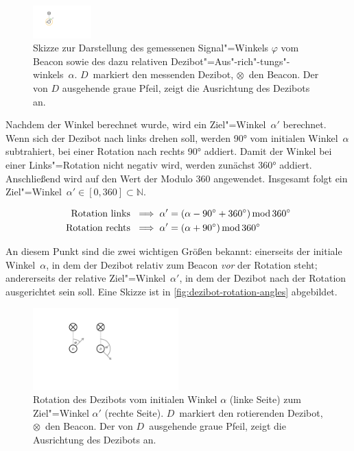 \begin{figure}[h]
    \centering
    \includegraphics[width=0.2\textwidth]{../assets/signal_dezibot_angle.pdf}
    \caption{Skizze zur Darstellung des gemessenen Signal"=Winkels $\varphi$ vom Beacon sowie des dazu relativen Dezibot"=Aus"-rich"-tungs"-winkels~$\alpha$. $D$~markiert den messenden Dezibot, $\otimes$~den Beacon. Der von $D$ ausgehende graue Pfeil, zeigt die Ausrichtung des Dezibots an.}
    \label{fig:signal-dezibot-angle}
\end{figure}

Nachdem der Winkel berechnet wurde, wird ein Ziel"=Winkel~$\alpha'$ berechnet. Wenn sich der Dezibot nach links drehen soll, werden 90° vom initialen Winkel~$\alpha$ subtrahiert, bei einer Rotation nach rechts 90° addiert. Damit der Winkel bei einer Links"=Rotation nicht negativ wird, werden zunächst 360° addiert. Anschließend wird auf den Wert der Modulo 360 angewendet. Insgesamt folgt ein Ziel"=Winkel~$\alpha' \in [0,360] \subset \mathbb{N}$.

\begin{equation*}
\begin{aligned}
    \text{Rotation links } &\implies \alpha' = (\alpha - 90^\circ + 360^\circ) \operatorname{mod} 360^\circ \\
    \text{Rotation rechts } &\implies \alpha' = (\alpha + 90^\circ) \operatorname{mod} 360^\circ
\end{aligned}
\end{equation*}

An diesem Punkt sind die zwei wichtigen Größen bekannt: einerseits der initiale Winkel~$\alpha$, in dem der Dezibot relativ zum Beacon \emph{vor} der Rotation steht; andererseits der relative Ziel"=Winkel~$\alpha'$, in dem der Dezibot nach der Rotation ausgerichtet sein soll. Eine Skizze ist in \autoref{fig:dezibot-rotation-angles} abgebildet.

\begin{figure}[h]
    \centering
    \includegraphics[width=0.5\textwidth]{../assets/dezibot_rotation_angles.pdf}
    \caption{Rotation des Dezibots vom initialen Winkel $\alpha$ (linke Seite) zum Ziel"=Winkel $\alpha'$ (rechte Seite). $D$~markiert den rotierenden Dezibot, $\otimes$~den Beacon. Der von $D$~ausgehende graue Pfeil, zeigt die Ausrichtung des Dezibots an.}
    \label{fig:dezibot-rotation-angles}
\end{figure}

